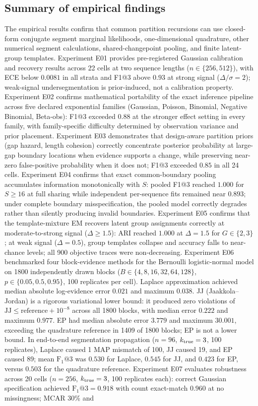 \subsection{Summary of empirical findings}
The empirical results confirm that common partition recursions can use closed-form conjugate segment marginal likelihoods, one-dimensional quadrature, other numerical segment calculations, shared-changepoint pooling, and finite latent-group templates. Experiment E01 provides pre-registered Gaussian calibration and recovery results across 22 cells at two sequence lengths ($n\in\{256,512\}$), with ECE below $0.0081$ in all strata and F1@3 above $0.93$ at strong signal ($\Delta/\sigma=2$); weak-signal undersegmentation is prior-induced, not a calibration property. Experiment E02 confirms mathematical portability of the exact inference pipeline across five declared exponential families (Gaussian, Poisson, Binomial, Negative Binomial, Beta-obs): F1@3 exceeded $0.88$ at the stronger effect setting in every family, with family-specific difficulty determined by observation variance and prior placement. Experiment E03 demonstrates that design-aware partition priors (gap hazard, length cohesion) correctly concentrate posterior probability at large-gap boundary locations when evidence supports a change, while preserving near-zero false-positive probability when it does not; F1@3 exceeded $0.85$ in all 24 cells. Experiment E04 confirms that exact common-boundary pooling accumulates information monotonically with $S$: pooled F1@3 reached $1.000$ for $S\geq16$ at full sharing while independent per-sequence fits remained near $0.893$; under complete boundary misspecification, the pooled model correctly degrades rather than silently producing invalid boundaries. Experiment E05 confirms that the template-mixture EM recovers latent group assignments correctly at moderate-to-strong signal ($\Delta\geq1.5$): ARI reached $1.000$ at $\Delta=1.5$ for $G\in\{2,3\}$; at weak signal ($\Delta=0.5$), group templates collapse and accuracy falls to near-chance levels; all 900 objective traces were non-decreasing. Experiment E06 benchmarked four block-evidence methods for the Bernoulli logistic-normal model on 1800 independently drawn blocks ($B\in\{4,8,16,32,64,128\}$, $p\in\{0.05,0.5,0.95\}$, 100 replicates per cell). Laplace approximation achieved median absolute log-evidence error $0.021$ and maximum $0.038$. JJ (Jaakkola--Jordan) is a rigorous variational lower bound: it produced zero violations of $\mathrm{JJ}\le\mathrm{reference}+10^{-8}$ across all 1800 blocks, with median error $0.222$ and maximum $0.977$. EP had median absolute error $3.779$ and maximum $30.001$, exceeding the quadrature reference in 1409 of 1800 blocks; EP is not a lower bound. In end-to-end segmentation propagation ($n=96$, $k_{\rm true}=3$, 100 replicates), Laplace caused 1 MAP mismatch of 100, JJ caused 19, and EP caused 89; mean $\mathrm{F}_1@3$ was $0.530$ for Laplace, $0.545$ for JJ, and $0.423$ for EP, versus $0.503$ for the quadrature reference. Experiment E07 evaluates robustness across 20 cells ($n=256$, $k_{\rm true}=3$, 100 replicates each): correct Gaussian specification achieved $\mathrm{F}_1@3=0.918$ with count exact-match $0.960$ at no missingness; MCAR 30\% and 